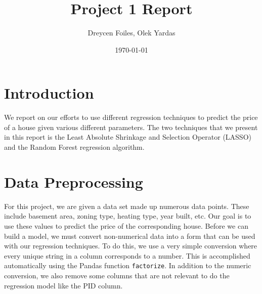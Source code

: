 \documentclass{article}
\title{Project 1 Report}
\author{Dreycen Foiles, Olek Yardas}
\date{\today}
\begin{document}
\maketitle

\section{Introduction}

We report on our efforts to use different regression techniques to predict the price of a house given various different parameters. The two techniques that we present in this report is the Least Absolute Shrinkage and Selection Operator (LASSO) and the Random Forest regression algorithm.

\section{Data Preprocessing}

For this project, we are given a data set made up numerous data points. These include basement area, zoning type, heating type, year built, etc. Our goal is to use these values to predict the price of the corresponding house. Before we can build a model, we must convert non-numerical data into a form that can be used with our regression techniques. To do this, we use a very simple conversion where every unique string in a column corresponds to a number. This is accomplished automatically using the Pandas function \texttt{factorize}. In addition to the numeric conversion, we also remove some columns that are not relevant to do the regression model like the PID column. 
\end{document}
